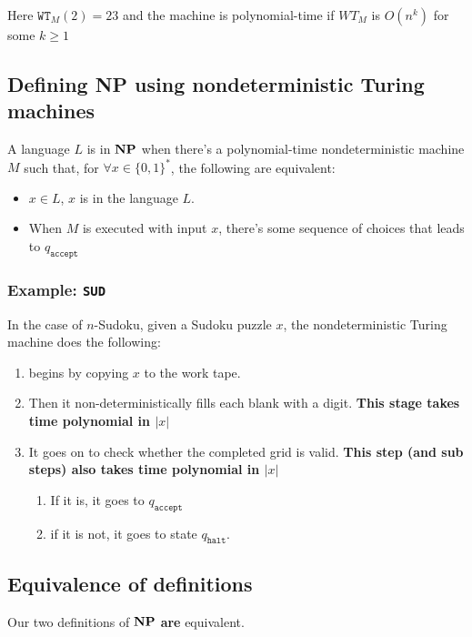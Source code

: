 \documentclass{article}
\begin{document}
Here $\texttt{WT}_{M}(2) = 23$ and the machine is polynomial-time if $WT_{M}$ is $O(n^{k})$ for some $k \geq 1$

\subsection{Defining \bf{NP} using nondeterministic Turing machines}
\label{subsec:NPNDTM}


A language $L$ is in $\bf{NP}$ when there's a polynomial-time nondeterministic machine $M$ such that, for $\forall x \in \{ 0,1 \} ^{*}$, the following are equivalent:

\begin{itemize}
  \item $x \in L$, $x$ is in the language $L$.
  \item When $M$ is executed with input $x$, there's some sequence of choices that leads to $q_{\texttt{accept} }$
\end{itemize}

\subsubsection{Example: \texttt{SUD} }

In the case of $n$-Sudoku, given a Sudoku puzzle $x$, the nondeterministic Turing machine does the following:

\begin{enumerate}
  \item begins by copying $x$ to the work tape.
  \item Then it non-deterministically fills each blank with a digit. \textbf{This stage takes time polynomial in $|x|$}
  \item It goes on to check whether the completed grid is valid. \textbf{This step (and sub steps) also takes time polynomial in $|x|$}
        \begin{enumerate}
          \item If it is, it goes to $q_{\texttt{accept} }$
          \item if it is not, it goes to state $q_{\texttt{halt} }$.
        \end{enumerate}
\end{enumerate}

\subsection{Equivalence of definitions}

Our two definitions of $\bf{NP}$ \textbf{are} equivalent.
\end{document}
